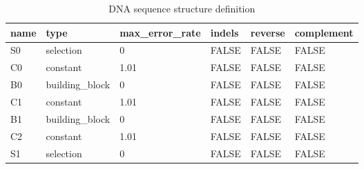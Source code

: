 \begin{table}[htbp]
\centering
\caption{DNA sequence structure definition}
\label{tab:table5}
\begin{tabular}{llllll}
\toprule
name & type & max\_error\_rate & indels & reverse & complement \\
\midrule
S0 & selection & 0 & FALSE & FALSE & FALSE \\
C0 & constant & 1.01 & FALSE & FALSE & FALSE \\
B0 & building\_block & 0 & FALSE & FALSE & FALSE \\
C1 & constant & 1.01 & FALSE & FALSE & FALSE \\
B1 & building\_block & 0 & FALSE & FALSE & FALSE \\
C2 & constant & 1.01 & FALSE & FALSE & FALSE \\
S1 & selection & 0 & FALSE & FALSE & FALSE \\
\bottomrule
\end{tabular}
\end{table}
